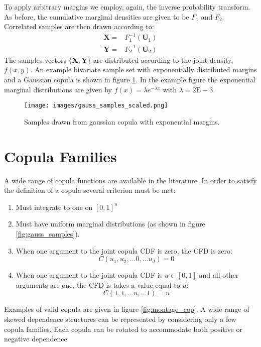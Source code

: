 To apply arbitrary margins we employ, again, the inverse probability transform.  As before, the cumulative marginal densities are given to be $F_1$ and $F_2$.
Correlated samples are then drawn according to:
\begin{eqnarray}
\mathbf X = & F_1^{-1}(\mathbf U_1) \\
\mathbf Y = & F_2^{-1}(\mathbf U_2)
\end{eqnarray}
The samples vectors $\{\mathbf X, \mathbf Y\}$ are distributed according to the joint density, $f(x,y)$.  An example bivariate sample set with exponentially distributed margins and a Gaussian copula is shown in figure \ref{fig:gauss_samples_scaled}.  In the example figure the exponential marginal distributions are given by $f(x)=\lambda e^{-\lambda x}$ with $\lambda=2\mathrm{E-}3$.

\begin{figure}[!htbp]
	\centering
	\texttt{[image: images/gauss\_samples\_scaled.png]}
	\caption{Samples drawn from gaussian copula with exponential margins.}
	\label{fig:gauss_samples_scaled}
\end{figure}


\section*{Copula Families}

A wide range of copula functions are available in the literature.  In order to satisfy the definition of a copula several criterion must be met:
\begin{enumerate}
	\item Must integrate to one on $[0, 1]^n$
	\item Must have uniform marginal distributions (as shown in figure \ref{fig:gauss_samples}).
	\item When one argument to the joint copula CDF is zero, the CFD is zero:
	\begin{equation}
	C(u_1, u_2, ... 0, ... u_d) = 0
	\end{equation}
	\item When one argument to the joint copula CDF is $u\in[0,1]$ and all other arguments are one, the CFD is takes a value equal to $u$:
	\begin{equation}
	C(1, 1, ... u, ... 1) = u
	\end{equation}
\end{enumerate}

Examples of valid copula are given in figure \ref{fig:montage_cop}.  A wide range of skewed dependence structures can be represented by considering only a few copula families.  Each copula can be rotated to accommodate both positive or negative dependence.

